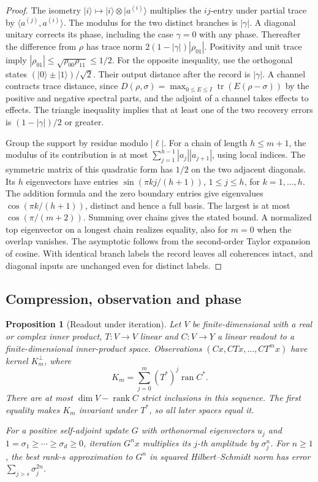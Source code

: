 \documentclass[11pt,reqno]{amsart}
\newtheorem{proposition}[theorem]{Proposition}
\theoremstyle{definition}
\theoremstyle{remark}
\numberwithin{equation}{section}
\begin{document}
\begin{proof}
The isometry \(|i\rangle\mapsto |i\rangle\otimes |a^{(i)}\rangle\)
multiplies the \(ij\)-entry under partial trace by
\(\langle a^{(j)},a^{(i)}\rangle\). The modulus for the two distinct
branches is \(|\gamma|\). A diagonal unitary corrects its phase,
including the case \(\gamma=0\) with any phase. Thereafter the difference
from \(\rho\) has trace norm \(2(1-|\gamma|)|\rho_{01}|\). Positivity
and unit trace imply \(|\rho_{01}|\le\sqrt{\rho_{00}\rho_{11}}\le1/2\).
For the opposite inequality, use the orthogonal states
\((|0\rangle\pm |1\rangle)/\sqrt2\). Their output distance after the
record is \(|\gamma|\). A channel contracts trace distance, since
\(D(\rho,\sigma)=\max_{0\le E\le I}\operatorname{tr}(E(\rho-\sigma))\)
by the positive and negative spectral parts, and the adjoint of a
channel takes effects to effects. The triangle inequality implies
that at least one of the two recovery errors is \((1-|\gamma|)/2\)
or greater.

Group the support by residue modulo \(|\ell|\). For a chain of
length \(h\le m+1\), the modulus of its contribution is at most
\(\sum_{j=1}^{h-1}|a_j||a_{j+1}|\), using local indices. The symmetric
matrix of this quadratic form has \(1/2\) on the two adjacent
diagonals. Its \(h\) eigenvectors have entries
\(\sin(\pi kj/(h+1))\), \(1\le j\le h\), for \(k=1,\ldots,h\).
The addition formula and the zero boundary entries give eigenvalues
\(\cos(\pi k/(h+1))\), distinct and hence a full basis. The largest
is at most \(\cos(\pi/(m+2))\). Summing over chains gives the stated
bound. A normalized top eigenvector on a longest chain realizes
equality, also for \(m=0\) when the overlap vanishes. The asymptotic
follows from the second-order Taylor expansion of cosine. With
identical branch labels the record leaves all coherences intact,
and diagonal inputs are unchanged even for distinct labels.
\end{proof}

\subsection*{Compression, observation and phase}

\begin{proposition}[Readout under iteration]\label{d4:krylov}
Let \(V\) be finite-dimensional with a real or complex inner product,
\(T:V\to V\) linear and \(C:V\to Y\) a linear readout to a
finite-dimensional inner-product space. Observations
\((Cx,CTx,\ldots,CT^m x)\) have kernel \(K_m^\perp\), where
\[
 K_m=\sum_{j=0}^m (T^*)^j\operatorname{ran} C^*.
\]
There are at most \(\dim V-\operatorname{rank}C\) strict inclusions
in this sequence. The first equality makes \(K_m\) invariant under
\(T^*\), so all later spaces equal it.

For a positive self-adjoint update \(G\) with orthonormal eigenvectors
\(u_j\) and \(1=\sigma_1\ge\cdots\ge\sigma_d\ge0\), iteration
\(G^n x\) multiplies its \(j\)-th amplitude by \(\sigma_j^n\).
For \(n\ge1\), the best rank-\(s\) approximation to \(G^n\) in
squared Hilbert--Schmidt norm has error \(\sum_{j>s}\sigma_j^{2n}\).
\end{proposition}
\end{document}
